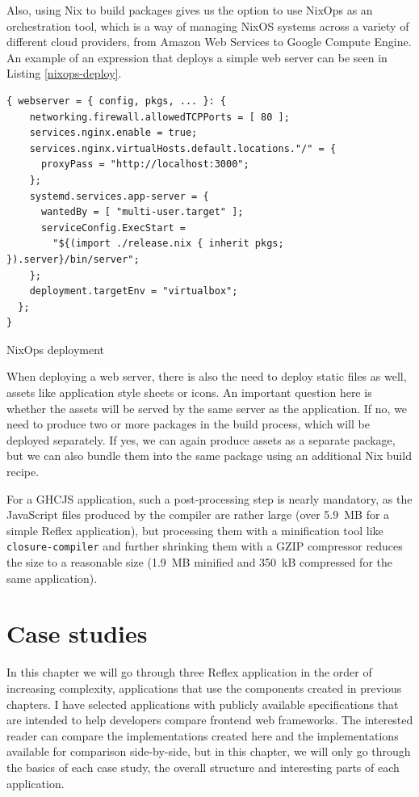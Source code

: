 \documentclass[english,zadani,odsaz]{fitthesis}
\begin{document}
Also, using Nix to build packages gives us the option to use NixOps as an
orchestration tool, which is a way of managing NixOS systems across a variety of
different cloud providers, from Amazon Web Services to Google Compute Engine. An
example of an expression that deploys a simple web server can be seen in Listing
\ref{nixops-deploy}.

\begin{listing}[b]
\begin{verbatim}
{ webserver = { config, pkgs, ... }: {
    networking.firewall.allowedTCPPorts = [ 80 ];
    services.nginx.enable = true;
    services.nginx.virtualHosts.default.locations."/" = {
      proxyPass = "http://localhost:3000";
    };
    systemd.services.app-server = {
      wantedBy = [ "multi-user.target" ];
      serviceConfig.ExecStart =
        "${(import ./release.nix { inherit pkgs; }).server}/bin/server";
    };
    deployment.targetEnv = "virtualbox";
  };
}
\end{verbatim}
\caption{NixOps deployment \label{nixops-deploy}}
\end{listing}

When deploying a web server, there is also the need to deploy static files as
well, assets like application style sheets or icons. An important question here
is whether the assets will be served by the same server as the application. If
no, we need to produce two or more packages in the build process, which will be
deployed separately. If yes, we can again produce assets as a separate package,
but we can also bundle them into the same package using an additional Nix build
recipe.

For a GHCJS application, such a post-processing step is nearly mandatory, as the
JavaScript files produced by the compiler are rather large (over 5.9~MB
for a simple Reflex application), but processing them with a minification tool
like \texttt{closure-compiler} and further shrinking them with a GZIP compressor reduces
the size to a reasonable size (1.9~MB minified and 350~kB compressed
for the same application).

\chapter{Case studies}
\label{sec:orge92bdd3}
In this chapter we will go through three Reflex application in the order of
increasing complexity, applications that use the components created in previous
chapters. I have selected applications with publicly available specifications
that are intended to help developers compare frontend web frameworks. The
interested reader can compare the implementations created here and the
implementations available for comparison side-by-side, but in this chapter, we
will only go through the basics of each case study, the overall structure and
interesting parts of each application.
\end{document}
